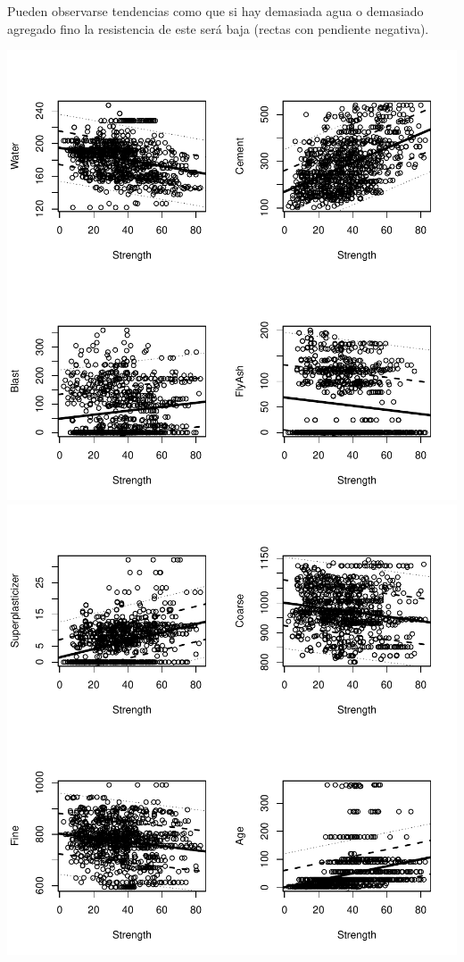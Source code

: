 \documentclass [a4paper] {article}
\begin{document}
Pueden observarse tendencias como que si hay demasiada agua o demasiado agregado fino la resistencia de este será baja (rectas con pendiente negativa).
\begin{center}
\includegraphics{entrega-analisis_concrete_plot_1}
\includegraphics{entrega-analisis_concrete_plot_2}
\end{center}
\end{document}
